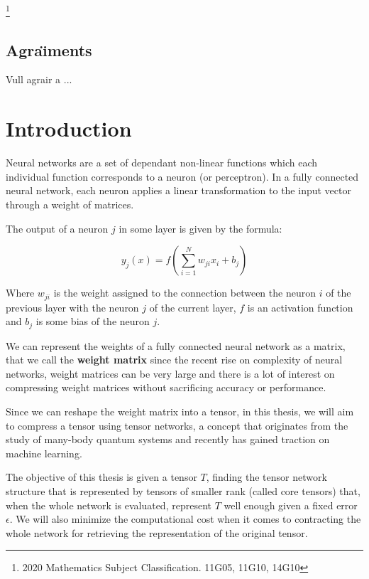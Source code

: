 \documentclass[11pt,a4paper,openright,oneside]{book}
\numberwithin{equation}{section}
\begin{document}
{\let\thefootnote\relax\footnote{2020 Mathematics Subject Classification. 11G05, 11G10, 14G10}}



\newpage 


\section*{Agra\"{\i}ments}

Vull agrair a ... 
\newpage

{\hypersetup{linkcolor=black}
\tableofcontents
}

\newpage

\setcounter{page}{1}
\chapter{Introduction}

Neural networks are a set of dependant non-linear functions which each individual function corresponds to 
a neuron (or perceptron). In a fully connected neural network, each neuron applies a linear transformation
to the input vector through a weight of matrices.

The output of a neuron $j$ in some layer is given by the formula:

$$ y_j(x) = f\left(\sum_{i=1}^N w_{ji} x_i + b_{j}\right) $$ 

Where $w_{ji}$ is the weight assigned to the connection between the neuron $i$ of the previous layer with the neuron
$j$ of the current layer, $f$ is an activation function and $b_j$ is some bias of the neuron $j$.

We can represent the weights of a fully connected neural network as a matrix, that we call the \textbf{weight matrix}
since the recent rise on complexity of neural networks, weight matrices can be very large and there is a lot of
interest on compressing weight matrices without sacrificing accuracy or performance.

Since we can reshape the weight matrix into a tensor, in this thesis, we will aim to compress a tensor
using tensor networks, a concept that originates from the study of many-body quantum systems \cite{orusTensorNetworksComplex2019}
and recently has gained traction on machine learning.

The objective of this thesis is given a tensor $T$, finding the tensor network structure that
is represented by tensors of smaller rank (called core tensors) that, when the whole
network is evaluated, represent $T$ well enough given a fixed error $\epsilon$. We will also minimize the computational cost 
when it comes to contracting the whole network for retrieving the representation of the original tensor.
\end{document}
